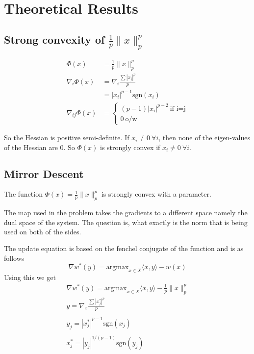 \section*{Theoretical Results}

\subsection*{Strong convexity of $\frac{1}{p} \| x \|_p^p$}
\begin{align*}
\Phi(x) &= \frac{1}{p} \| x \|_p^p \\
\nabla_i \Phi(x) &= \nabla_i \frac{\sum |x_j|^p}{p} \\
&= |x_i|^{p-1} \text{sgn}(x_i) \\
\nabla_{ij} \Phi(x) &= \begin{cases}(p-1)|x_i|^{p-2}\ \text{if i=j}\\ 0\ \text{o/w}\end{cases}
\end{align*}

So the Hessian is positive semi-definite. If $x_i \ne 0\ \forall i$, then none of the eigen-values of the Hessian are 0. So $\Phi(x)$ is strongly convex if $x_i \ne 0\ \forall i$.

\subsection*{Mirror Descent}
The function $\Phi(x) = \frac{1}{p} \| x \|_p^p$ is strongly convex with a parameter.

The map used in the problem takes the gradients to a different space namely the dual space of the system. 
The question is, what exactly is the norm that is being used on both of the sides.

The update equation is based on the fenchel conjugate of the function and is as follows
\begin{equation}
    \nabla w^*(y) = \text{argmax}_{x \in X} \langle x, y \rangle - w(x)
\end{equation}
Using this we get 
\begin{gather*}
    \nabla w^*(y) = \text{argmax}_{x \in X} \langle x, y \rangle - \frac{1}{p} \| x \|_p^p 
    \\
    y = \nabla_x \frac{\sum |x^*_j|^p}{p} \\
    \\
    y_j = |x^*_j|^{p-1} \text{sgn}(x_j) \\
    \\
    x_j^* = |y_j|^{1/(p-1)} \text{sgn}(y_j)
\end{gather*}

